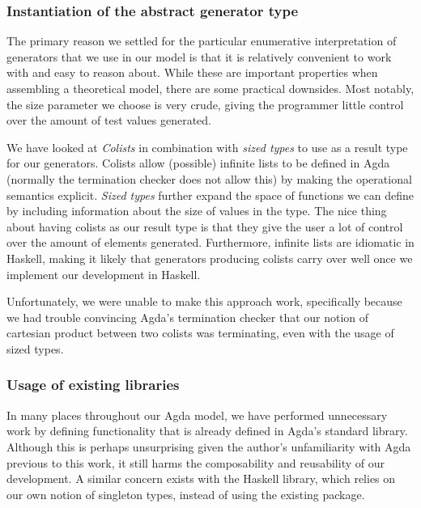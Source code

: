 \documentclass[a4paper,msc,twosized=semi]{uustthesis}
\let\oldemph\emph
\renewcommand\emph[1]{{\large\oldemph{#1}}}
\begin{document}
\subsubsection{Instantiation of the abstract generator type}

  The primary reason we settled for the particular enumerative interpretation of 
  generators that we use in our model is that it is relatively convenient to work
  with and easy to reason about. While these are important properties when assembling
  a theoretical model, there are some practical downsides. Most notably, the size parameter 
  we choose is very crude, giving the programmer little control over the amount of 
  test values generated. 

  We have looked at \emph{Colists} in combination with \emph{sized types} 
  \cite{abel2010miniagda} to use as a result type for our generators. Colists allow 
  (possible) infinite lists to be defined in Agda (normally the termination checker
  does not allow this) by making the operational semantics explicit. \emph{Sized types}
  further expand the space of functions we can define by including information about 
  the size of values in the type. The nice thing about having colists as our result 
  type is that they give the user a lot of control over the amount of elements generated.   
  Furthermore, infinite lists are idiomatic in Haskell, making it likely that generators 
  producing colists carry over well once we implement our development in Haskell. 

  Unfortunately, we were unable to make this approach work, specifically because we had 
  trouble convincing Agda's termination checker that our notion of cartesian product 
  between two colists was terminating, even with the usage of sized types. 

\subsubsection{Usage of existing libraries}

  In many places throughout our Agda model, we have performed unnecessary work by 
  defining functionality that is already defined in Agda's standard library. Although 
  this is perhaps unsurprising given the author's unfamiliarity with Agda previous to 
  this work, it still harms the composability and reusability of our development. A 
  similar concern exists with the Haskell library, which relies on our own notion of 
  singleton types, instead of using the existing package.  
\end{document}
